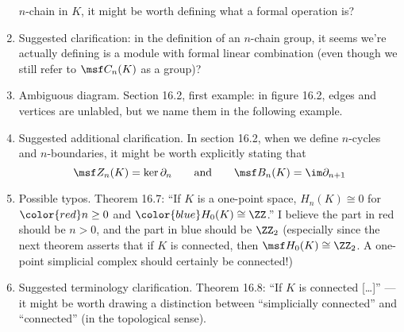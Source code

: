 \documentclass{fkletter}
\begin{document}
\begin{enumerate}
    $n$-chain in $K$, it might be worth defining what a formal operation is?
  \item Suggested clarification: in the definition of an $n$-chain group, it
    seems we're actually defining is a module with formal linear combination
    (even though we still refer to $\msf C_n(K)$ as a group)?
  \item Ambiguous diagram. Section 16.2, first example: in figure 16.2, edges
    and vertices are unlabled, but we name them in the following example.
  \item Suggested additional clarification. In section 16.2, when we define
    $n$-cycles and $n$-boundaries, it might be worth explicitly stating that
    \[
      \msf Z_n(K) = \ker \partial_n \qquad \text{and} \qquad \msf B_n(K) =
      \im\partial_{n+1}
    \]
  \item Possible typos. Theorem 16.7: ``If $K$ is a one-point space, $H_n(K)
    \cong 0$ for $\color{red} n \geq 0$ and $\color{blue}H_0(K) \cong \ZZ$.'' I
    believe the part in red should be $n > 0$, and the part in blue should be
    $\ZZ_2$ (especially since the next theorem asserts that if $K$ is connected,
    then $\msf H_0(K) \cong \ZZ_2$. A one-point simplicial complex should
    certainly be connected!)
  \item Suggested terminology clarification. Theorem 16.8: ``If $K$ is
    {\color{red} connected} [\ldots]'' --- it might be worth drawing a
    distinction between ``simplicially connected'' and ``connected'' (in the
    topological sense).
\end{enumerate}
\end{document}
